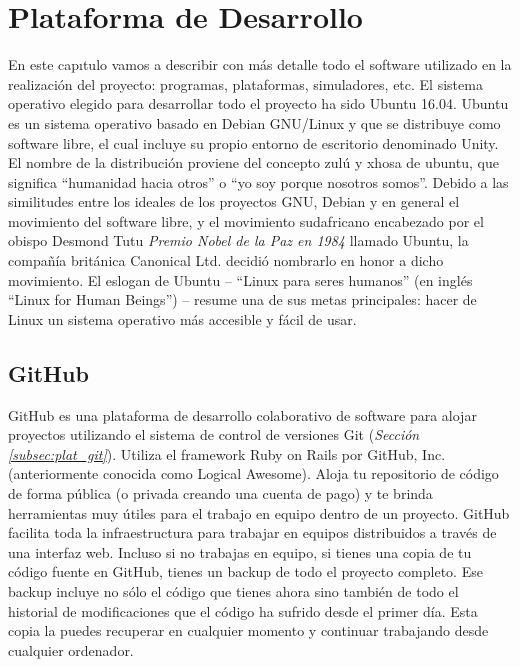 \chapter{Plataforma de Desarrollo}
\label{ch:PlataformaDesarrollo}

En este capıtulo vamos a describir con más detalle todo el software utilizado en la realización del proyecto: programas, plataformas, simuladores, etc. El sistema operativo elegido para desarrollar todo el proyecto ha sido Ubuntu 16.04. Ubuntu es un sistema operativo basado en Debian GNU/Linux y que se distribuye como software libre, el cual incluye su propio entorno de escritorio denominado Unity. El nombre de la distribución proviene del concepto zulú y xhosa de ubuntu, que significa “humanidad hacia otros” o “yo soy porque nosotros somos”. Debido a las similitudes entre los ideales de los proyectos GNU, Debian y en general el movimiento del software libre, y el movimiento sudafricano encabezado por el obispo Desmond Tutu \textit{Premio Nobel de la Paz en 1984} llamado Ubuntu, la compañía británica Canonical Ltd. decidió nombrarlo en honor a dicho movimiento. El eslogan de Ubuntu – “Linux para seres humanos” (en inglés “Linux for Human Beings”) – resume una de sus metas principales: hacer de Linux un sistema operativo más accesible y fácil de usar.

\section{GitHub}
\label{sec:plat_github}

GitHub\cite{github} es una plataforma de desarrollo colaborativo de software para alojar proyectos utilizando el sistema de control de versiones Git (\textit{Sección \ref{subsec:plat_git}}). Utiliza el framework Ruby on Rails por GitHub, Inc. (anteriormente conocida como Logical Awesome). Aloja tu repositorio de código de forma pública (o privada creando una cuenta de pago) y te brinda herramientas muy útiles para el trabajo en equipo dentro de un proyecto. GitHub facilita toda la infraestructura para trabajar en equipos distribuidos a través de una interfaz web. Incluso si no trabajas en equipo, si tienes una copia de tu código fuente en GitHub, tienes un backup de todo el proyecto completo. Ese backup incluye no sólo el código que tienes ahora sino también de todo el historial de modificaciones que el código ha sufrido desde el primer día. Esta copia la puedes recuperar en cualquier momento y continuar trabajando desde cualquier ordenador.

